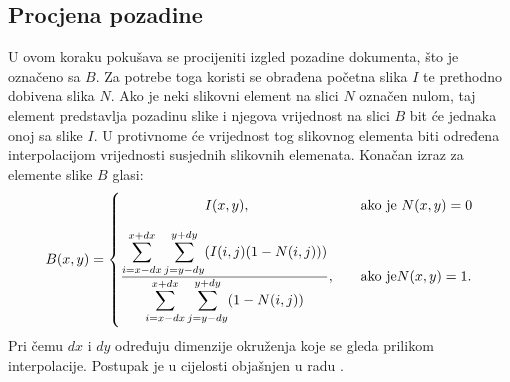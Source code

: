 \documentclass[times, utf8, zavrsni, numeric]{fer}
\begin{document}
\subsection{Procjena pozadine}
U ovom koraku pokušava se procijeniti izgled pozadine dokumenta, što je označeno sa $B$. 
Za potrebe toga koristi se obrađena početna slika $I$ te prethodno dobivena slika $N$.
Ako je neki slikovni element na slici $N$ označen nulom, taj element predstavlja pozadinu slike i njegova vrijednost na slici $B$ bit će jednaka onoj sa slike $I$.
U protivnome će vrijednost tog slikovnog elementa biti određena interpolacijom vrijednosti susjednih slikovnih elemenata.
Konačan izraz za elemente slike $B$ glasi:
\[
    B(x, y) =
    \begin{cases}
        \hfil
        I(x, y),    & \quad \text{ako je } N(x, y) = 0\\[1em]
        \frac{
            \displaystyle \sum_{i = x-dx}^{x+dx}
            \displaystyle \sum_{j = y-dy}^{y+dy}
            (I(i, j)(1 - N(i, j)))
        } {
            \displaystyle \sum_{i = x-dx}^{x+dx}
            \displaystyle \sum_{j = y-dy}^{y+dy}
            (1 - N(i, j))
        }, & \quad \text{ako je} N(x, y) = 1.\\

    \end{cases}
\]
Pri čemu $dx$ i $dy$ određuju dimenzije okruženja koje se gleda prilikom interpolacije.
Postupak je u cijelosti objašnjen u radu \cite{AdaptiveBinarization}.\\
\end{document}
